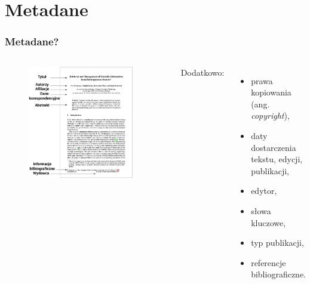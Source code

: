 \documentclass[11pt,t]{beamer}
\begin{document}
\section{Metadane}
\begin{frame}
\frametitle{Metadane?}
\begin{columns}
\begin{figure}[ht!]
\includegraphics[width=0.9\textwidth]{art_meta.png}
\end{figure}
Dodatkowo:\\
\begin{itemize}
\item prawa kopiowania (ang. \textit{copyright}),
\item daty dostarczenia tekstu, edycji, publikacji,
\item edytor,
\item słowa kluczowe,
\item typ publikacji,
\item referencje bibliograficzne.
\end{itemize}
\end{columns}
\end{frame}
\end{document}
